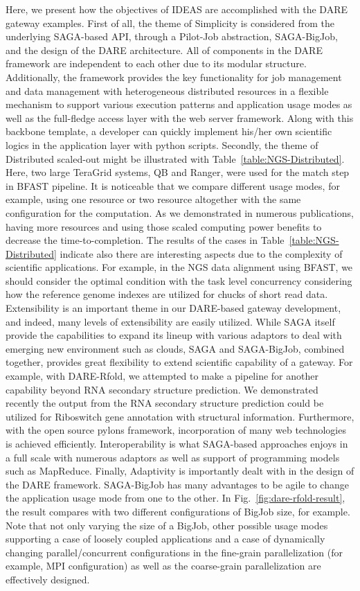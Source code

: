 \documentclass{sig-alternate}
\begin{document}
Here, we present how the objectives of IDEAS are accomplished with the DARE gateway examples.  First of all, the theme of Simplicity is considered from the underlying SAGA-based API, through a Pilot-Job abstraction, SAGA-BigJob, and the design of the DARE architecture.  All of components in the DARE framework are independent to each other due to its modular structure.  Additionally, the framework provides the key functionality for job management and data management with heterogeneous distributed resources in a flexible mechanism to support various execution patterns and application usage modes as well as the full-fledge access layer with the web server framework.  Along with this backbone template, a developer can quickly implement his/her own scientific logics in the application layer with python scripts.  Secondly, the theme of Distributed scaled-out might be illustrated with Table~\ref{table:NGS-Distributed}.  Here, two large TeraGrid systems, QB and Ranger, were used for the match step in BFAST pipeline.  It is noticeable that we compare different usage modes, for example, using one resource or two resource altogether with the same configuration for the computation.  As we demonstrated in numerous publications, having more resources and using those scaled computing power benefits to decrease the time-to-completion.  The results of the cases in Table~\ref{table:NGS-Distributed} indicate also there are interesting aspects due to the complexity of scientific applications.  For example, in the NGS data alignment using BFAST, we should consider the optimal condition with the task level concurrency considering how the reference genome indexes are utilized for chucks of short read data\cite{ecmls11}.  Extensibility is an important theme in our DARE-based gateway development, and indeed, many levels of extensibility are easily utilized.  While SAGA itself provide the capabilities to expand its lineup with various adaptors to deal with emerging new environment such as clouds, SAGA and SAGA-BigJob, combined together, provides great flexibility to extend scientific capability of a gateway. For example, with DARE-Rfold, we attempted to make a pipeline for another capability beyond RNA secondary structure prediction.  We demonstrated recently the output from the RNA secondary structure prediction could be utilized for Riboswitch gene annotation with structural information.  Furthermore, with the open source pylons framework, incorporation of many web technologies is achieved efficiently.  Interoperability is what SAGA-based approaches enjoys in a full scale with numerous adaptors as well as support of programming models such as MapReduce.  Finally, Adaptivity is importantly dealt with in the design of the DARE framework.  SAGA-BigJob has many advantages to be agile to change the application usage mode from one to the other.  In Fig.~\ref{fig:dare-rfold-result}, the result compares with two different configurations of BigJob size, for example.  Note that not only varying the size of a BigJob, other possible usage modes supporting a case of loosely coupled applications and a case of dynamically changing parallel/concurrent configurations in the fine-grain parallelization (for example, MPI configuration) as well as the coarse-grain parallelization are effectively designed. 










\end{document}
